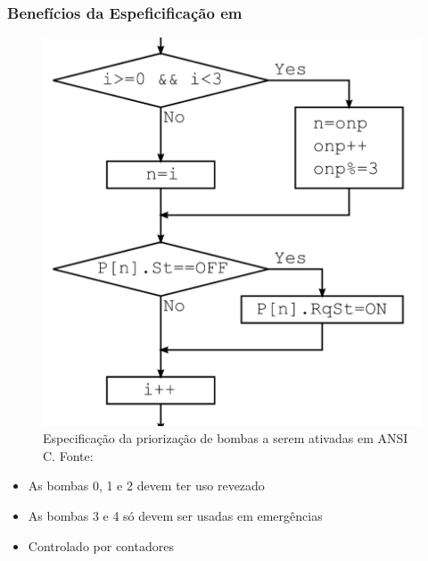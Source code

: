 \documentclass{beamer}
\begin{document}
  
  \begin{frame}
    \frametitle{Benefícios da Espeficificação em \TLA}

    \begin{minipage}{0.45\textwidth}
      \begin{figure}
  \includegraphics[width=\textwidth]{activate_ansi.png}
  \caption{Especificação da priorização de bombas a serem ativadas em ANSI C.
    Fonte: \cite{pumps}}
      \end{figure}

    \end{minipage}
    \hfill
    \begin{minipage}{0.5\textwidth}\raggedleft
      \begin{itemize}
      \item As bombas 0, 1 e 2 devem ter uso revezado
      \item As bombas 3 e 4 só devem ser usadas em emergências
      \item Controlado por contadores
      \end{itemize}
    \end{minipage}
    \end{frame}
    
\end{document}
